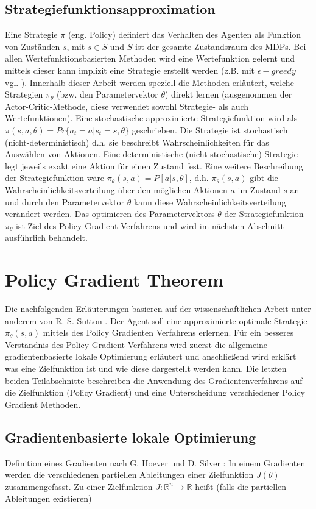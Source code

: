 \documentclass[conference]{IEEEtran}
\begin{document}
\subsection{Strategiefunktionsapproximation}
Eine Strategie $\pi$ (eng. Policy) definiert das Verhalten des Agenten als Funktion von Zuständen $s$, mit $s \in S$ und $S$ ist der gesamte Zustandsraum des MDPs. Bei allen Wertefunktionsbasierten Methoden wird eine Wertefunktion gelernt und mittels dieser kann implizit eine Strategie erstellt werden (z.B. mit $\epsilon-greedy$ vgl. \cite{silver_15}). Innerhalb dieser Arbeit werden speziell die Methoden erläutert, welche Strategien $\pi_\theta$ (bzw. den Parametervektor $\theta$) direkt lernen (ausgenommen der Actor-Critic-Methode, diese verwendet sowohl Strategie- als auch Wertefunktionen). Eine stochastische approximierte Strategiefunktion wird als $\pi(s,a,\theta) = Pr \{ a_t = a | s_t = s, \theta \}$ geschrieben. Die Strategie ist stochastisch (nicht-deterministisch) d.h. sie beschreibt Wahrscheinlichkeiten für das Auswählen von Aktionen. Eine deterministische (nicht-stochastische) Strategie legt jeweils exakt eine Aktion für einen Zustand fest. Eine weitere Beschreibung der Strategiefunktion wäre $\pi_\theta (s,a) = P[a|s,\theta]$, d.h. $\pi_\theta (s,a)$ gibt die Wahrscheinlichkeitsverteilung über den möglichen Aktionen $a$ im Zustand $s$ an und durch den Parametervektor $\theta$ kann diese Wahrscheinlichkeitsverteilung verändert werden. Das optimieren des Parametervektors $\theta$ der Strategiefunktion $\pi_\theta$ ist Ziel des Policy Gradient Verfahrens und wird im nächsten Abschnitt ausführlich behandelt. 

\section{Policy Gradient Theorem}
Die nachfolgenden Erläuterungen basieren auf der wissenschaftlichen Arbeit unter anderem von R. S. Sutton \cite{sutton_99}. Der Agent soll eine approximierte optimale Strategie $\pi_\theta (s, a)$ mittels des Policy Gradienten Verfahrens erlernen. Für ein besseres Verständnis des Policy Gradient Verfahrens wird zuerst die allgemeine gradientenbasierte lokale Optimierung erläutert und anschließend wird erklärt was eine Zielfunktion ist und wie diese dargestellt werden kann. Die letzten beiden  Teilabschnitte beschreiben die Anwendung des Gradientenverfahrens auf die Zielfunktion (Policy Gradient) und eine Unterscheidung verschiedener Policy Gradient Methoden.

\subsection{Gradientenbasierte lokale Optimierung}
Definition eines Gradienten nach G. Hoever \cite[vgl. S. 213]{hoever_14} und D. Silver \cite{silver_15}: In einem Gradienten werden die verschiedenen partiellen Ableitungen einer Zielfunktion $J(\theta)$ zusammengefasst. Zu einer Zielfunktion $J : \mathbb{R}^n \rightarrow \mathbb{R}$ heißt (falls die partiellen Ableitungen existieren)
\end{document}
